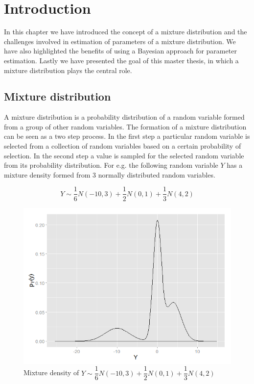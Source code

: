 
\chapter{Introduction}
\label{ch : introduction}

In this chapter we have introduced the concept of a mixture distribution and the challenges involved in estimation of parameters of a mixture distribution. We have also highlighted the benefits of using a Bayesian approach for parameter estimation. Lastly we have presented the goal of this master thesis, in which a mixture distribution plays the central role.

\section{Mixture distribution}
\label{sec : mixture_distribution}
A mixture distribution is a probability distribution of a random variable formed from a group of other random variables. The formation of a mixture distribution can be seen as a two step process. In the first step a particular random variable is selected from a collection of random variables based on a certain probability of selection. In the second step a value is sampled for the selected random variable from its probability distribution. For e.g. the following random variable $Y$ has a mixture density formed from 3 normally distributed random variables.

$$Y \sim \dfrac{1}{6}N(-10,3) + \dfrac{1}{2}N(0,1) + \dfrac{1}{3}N(4,2)$$

\begin{figure}
	\centering
	\captionsetup{justification=centering}
	\includegraphics[scale=0.5]{mainmatter/chapter_1_introduction/mixture_density.png}
	\caption{Mixture density of $Y \sim \dfrac{1}{6}N(-10,3) + \dfrac{1}{2}N(0,1) + \dfrac{1}{3}N(4,2)$}
	\label{fig : mixture_density_1}
\end{figure}

